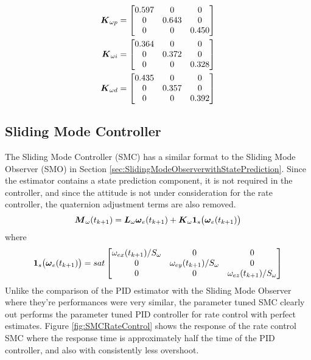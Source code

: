 \begin{subequations}
  \begin{align}
    \boldsymbol{K}_{\omega p} &= \begin{bmatrix} 0.597 & 0 & 0 \\ 0 & 0.643 & 0 \\ 0 & 0 & 0.450 \end{bmatrix} \\
    \boldsymbol{K}_{\omega i} &= \begin{bmatrix} 0.364 & 0 & 0 \\ 0 & 0.372 & 0 \\ 0 & 0 & 0.328 \end{bmatrix} \\
    \boldsymbol{K}_{\omega d} &= \begin{bmatrix} 0.435 & 0 & 0 \\ 0 & 0.357 & 0 \\ 0 & 0 & 0.392 \end{bmatrix}
  \end{align}
  \label{eqn:PIDRateControlGains}
\end{subequations}

\subsection{Sliding Mode Controller}
\label{subsec:SlidingModeController}

The Sliding Mode Controller (SMC) has a similar format to the Sliding Mode Observer (SMO) in Section \ref{sec:SlidingModeObserverwithStatePrediction}.  Since the estimator contains a state prediction component, it is not required in the controller, and since the attitude is not under consideration for the rate controller, the quaternion adjustment terms are also removed.
\begin{equation}
  \boldsymbol{M}_{\omega}(t_{k+1}) = \boldsymbol{L}_{\omega} \boldsymbol{\omega}_e(t_{k+1}) + \boldsymbol{K}_{\omega}\boldsymbol{1}_s \big(\boldsymbol{\omega}_e(t_{k+1}) \big)
  \label{eqn:SMController}
\end{equation}
where
\begin{equation}
  \boldsymbol{1}_s \big(\boldsymbol{\omega}_e(t_{k+1}) \big) = sat \begin{bmatrix} \omega_{ex}(t_{k+1}) / S_{\omega} &0 &0 \\ 0 & \omega_{ey}(t_{k+1}) / S_{\omega} & 0 \\ 0 & 0 & \omega_{ez}(t_{k+1}) / S_{\omega} \end{bmatrix}
\end{equation}
Unlike the comparison of the PID estimator with the Sliding Mode Observer where they're performances were very similar, the parameter tuned SMC clearly out performs the parameter tuned PID controller for rate control with perfect estimates.  Figure \ref{fig:SMCRateControl} shows the response of the rate control SMC where the response time is approximately half the time of the PID controller, and also with consistently less overshoot.

